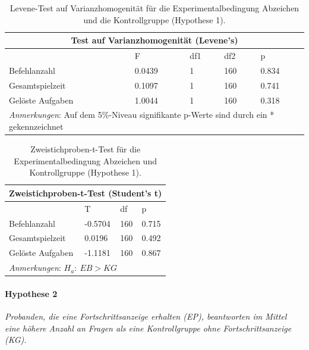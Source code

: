 \begin{table}[htbp]
\centering
\caption{Levene-Test auf Varianzhomogenität für die Experimentalbedingung Abzeichen und die Kontrollgruppe (Hypothese 1).}
\begin{tabular}{ |p{4cm}||p{2.0cm}|p{2.0cm}|p{2.0cm}|p{2.0cm}| }
 \hline
 \multicolumn{5}{|c|}{Test auf Varianzhomogenität (Levene's)} \\
 \hline
 & F & df1 &df2 &p \\
 \hline
  Befehlanzahl      & 0.0439    & 1 &   160 & 0.834\\
  Gesamtspielzeit   & 0.1097    & 1 &   160 & 0.741\\
  Gelöste Aufgaben  & 1.0044    & 1 &   160 & 0.318\\
 \hline
 \multicolumn{5}{l}{%
 \small%
\textit{Anmerkungen}: Auf dem 5\%-Niveau signifikante p-Werte sind durch ein * gekennzeichnet
}\\
\end{tabular}
\label{levene_hypo_1}
\end{table}
\begin{table}[htbp]
\centering
\caption{Zweistichproben-t-Test für die Experimentalbedingung Abzeichen und Kontrollgruppe (Hypothese 1).}
\begin{tabular}{ |p{4cm}||p{2.0cm}|p{2.0cm}|p{2.0cm}| }
 \hline
 \multicolumn{4}{|c|}{Zweistichproben-t-Test (Student's t)} \\
 \hline
 & T &df & p \\
 \hline
  Befehlanzahl       & -0.5704  &   160 & 0.715\\
  Gesamtspielzeit    &  0.0196  &   160 & 0.492\\
  Gelöste Aufgaben   & -1.1181  &   160 & 0.867\\
 \hline
 \multicolumn{4}{l}{%
 \small%
\textit{Anmerkungen}: $H_a:\: EB > KG$
}\\
\end{tabular}
\label{ttest_hypo_1}
\end{table}



\paragraph{Hypothese 2 }
\begin{center}
    \textit{Probanden, die eine Fortschrittsanzeige erhalten (EP), beantworten im Mittel eine höhere Anzahl an Fragen als eine Kontrollgruppe ohne Fortschrittsanzeige (KG).} 
\end{center}

